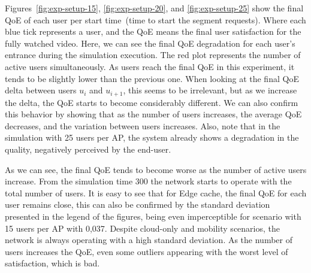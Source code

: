 Figures~\ref{fig:exp-setup-15}, \ref{fig:exp-setup-20}, and \ref{fig:exp-setup-25} show the final QoE of each user per start time~(time to start the segment requests). 
Where each blue tick represents a user, and
the QoE means the final user satisfaction for the fully watched video.
Here, we can see the final QoE degradation for each user's entrance during the simulation execution.
The red plot represents the number of active users simultaneously.  
As users reach the final QoE in this experiment, it tends to be slightly lower than the previous one. When looking at the final QoE delta between users $u_{i}$ and $u_{i + 1}$, this seems to be irrelevant, but as we increase the delta, the QoE starts to become considerably different. We can also confirm this behavior by showing that as the number of users increases, the average QoE decreases, and the variation between users increases. Also, note that in the simulation with 25 users per AP, the system already shows a degradation in the quality, negatively perceived by the end-user.

As we can see, the final QoE tends to become worse as the number of active users increase. From the simulation time 300 the network starts to operate with the total number of users. It is easy to see that for Edge cache, the final QoE for each user remains close, this can also be confirmed by the standard deviation presented in the legend of the figures, being even imperceptible for scenario with 15 users per AP with 0,037.
Despite cloud-only and mobility scenarios, the network is always operating with a high standard deviation. As the number of users increases the QoE, even some outliers appearing with the worst level of satisfaction, which is bad.





